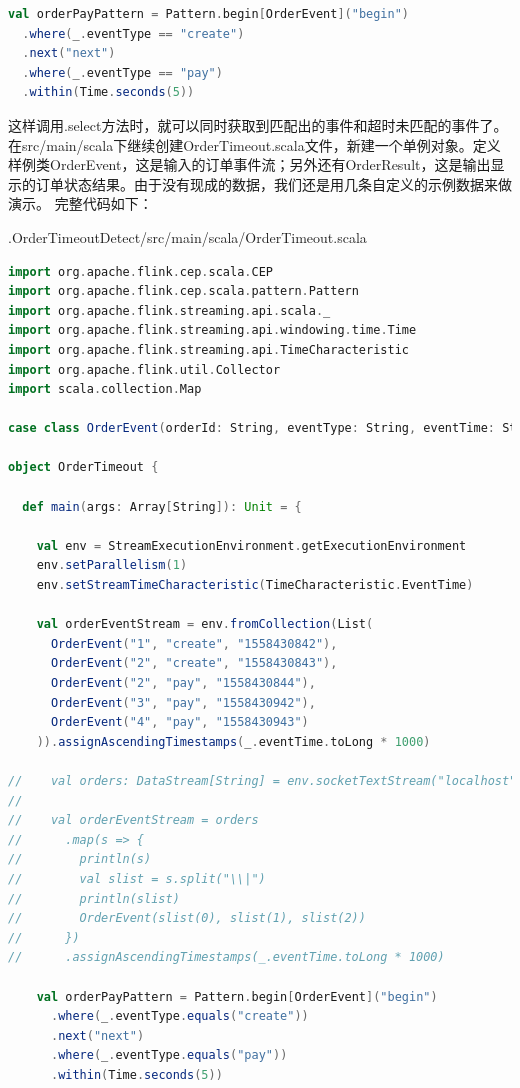 \documentclass[oneside]{ctexbook}
\begin{document}
\begin{lstlisting}[language=scala]
val orderPayPattern = Pattern.begin[OrderEvent]("begin")
  .where(_.eventType == "create")
  .next("next")
  .where(_.eventType == "pay")
  .within(Time.seconds(5))
\end{lstlisting}

这样调用.select方法时，就可以同时获取到匹配出的事件和超时未匹配的事件了。
在src/main/scala下继续创建OrderTimeout.scala文件，新建一个单例对象。定义样例类OrderEvent，这是输入的订单事件流；另外还有OrderResult，这是输出显示的订单状态结果。由于没有现成的数据，我们还是用几条自定义的示例数据来做演示。
完整代码如下：

.OrderTimeoutDetect/src/main/scala/OrderTimeout.scala
\begin{lstlisting}[language=scala]
import org.apache.flink.cep.scala.CEP
import org.apache.flink.cep.scala.pattern.Pattern
import org.apache.flink.streaming.api.scala._
import org.apache.flink.streaming.api.windowing.time.Time
import org.apache.flink.streaming.api.TimeCharacteristic
import org.apache.flink.util.Collector
import scala.collection.Map

case class OrderEvent(orderId: String, eventType: String, eventTime: String)

object OrderTimeout {

  def main(args: Array[String]): Unit = {

    val env = StreamExecutionEnvironment.getExecutionEnvironment
    env.setParallelism(1)
    env.setStreamTimeCharacteristic(TimeCharacteristic.EventTime)

    val orderEventStream = env.fromCollection(List(
      OrderEvent("1", "create", "1558430842"),
      OrderEvent("2", "create", "1558430843"),
      OrderEvent("2", "pay", "1558430844"),
      OrderEvent("3", "pay", "1558430942"),
      OrderEvent("4", "pay", "1558430943")
    )).assignAscendingTimestamps(_.eventTime.toLong * 1000)

//    val orders: DataStream[String] = env.socketTextStream("localhost", 9999)
//
//    val orderEventStream = orders
//      .map(s => {
//        println(s)
//        val slist = s.split("\\|")
//        println(slist)
//        OrderEvent(slist(0), slist(1), slist(2))
//      })
//      .assignAscendingTimestamps(_.eventTime.toLong * 1000)

    val orderPayPattern = Pattern.begin[OrderEvent]("begin")
      .where(_.eventType.equals("create"))
      .next("next")
      .where(_.eventType.equals("pay"))
      .within(Time.seconds(5))


\end{lstlisting}
\end{document}
